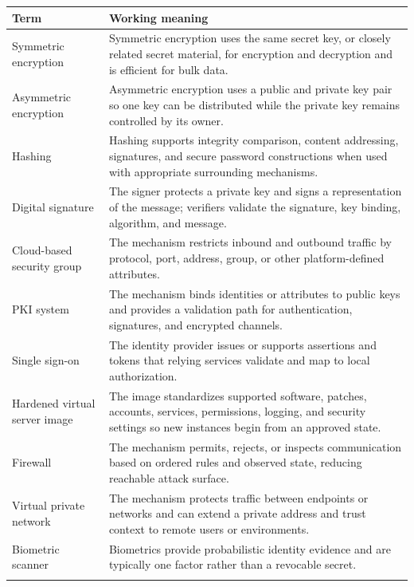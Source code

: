 \documentclass[11pt]{article}
\begin{document}
\begin{longtable}{@{}>{\RaggedRight\arraybackslash}p{}>{\RaggedRight\arraybackslash}p{}@{}}
\toprule\rowcolor{Navy}\color{white}\textbf{Term} & \color{white}\textbf{Working meaning}\\\midrule\endhead
Symmetric encryption & Symmetric encryption uses the same secret key, or closely related secret material, for encryption and decryption and is efficient for bulk data. \\\addlinespace[2pt]
Asymmetric encryption & Asymmetric encryption uses a public and private key pair so one key can be distributed while the private key remains controlled by its owner. \\\addlinespace[2pt]
Hashing & Hashing supports integrity comparison, content addressing, signatures, and secure password constructions when used with appropriate surrounding mechanisms. \\\addlinespace[2pt]
Digital signature & The signer protects a private key and signs a representation of the message; verifiers validate the signature, key binding, algorithm, and message. \\\addlinespace[2pt]
Cloud-based security group & The mechanism restricts inbound and outbound traffic by protocol, port, address, group, or other platform-defined attributes. \\\addlinespace[2pt]
PKI system & The mechanism binds identities or attributes to public keys and provides a validation path for authentication, signatures, and encrypted channels. \\\addlinespace[2pt]
Single sign-on & The identity provider issues or supports assertions and tokens that relying services validate and map to local authorization. \\\addlinespace[2pt]
Hardened virtual server image & The image standardizes supported software, patches, accounts, services, permissions, logging, and security settings so new instances begin from an approved state. \\\addlinespace[2pt]
Firewall & The mechanism permits, rejects, or inspects communication based on ordered rules and observed state, reducing reachable attack surface. \\\addlinespace[2pt]
Virtual private network & The mechanism protects traffic between endpoints or networks and can extend a private address and trust context to remote users or environments. \\\addlinespace[2pt]
Biometric scanner & Biometrics provide probabilistic identity evidence and are typically one factor rather than a revocable secret. \\\addlinespace[2pt]

\end{longtable}
\end{document}
